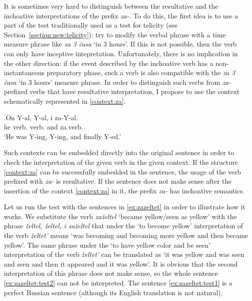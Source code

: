 It is sometimes very hard to distinguish between the resultative and the inchoative interpretations of the prefix \textit{za-}. To do this, the first idea is to use a part of the test traditionally used as a test for telicity (see Section~\ref{section:new:telicity}): try to modify the verbal phrase with a time measure phrase like \textit{za 3 \v{c}asa} `in 3 hours'. If this is not possible, then the verb can only have inceptive intepretation. Unfortunately, there is no implication in the other direction: if the event described by the inchoative verb has a non-instantaneous preparatory phase, such a verb is also compatible with the \textit{za 3 \v{c}asa} `in 3 hours' measure phrase. In order to distinguish such verbs from \textit{za}-prefixed verbs that have resultative interpretation, I propose to use the context schematically represented in \ref{context:za}.

\exg.\label{context:za}On Y-al, Y-al, i za-Y-al.\\
he verb. verb. and za.verb.\\
\vspace{0.5em}
`He was Y-ing, Y-ing, and finally Y-ed.'

Such contexts can be embedded directly into the original sentence in order to check the interpretation of the given verb in the given context. If the structure \ref{context:za} can be successfully embedded in the sentence, the usage of the verb prefixed with \textit{za-} is resultative. If the sentence does not make sense after the insertion of the context \ref{context:za} in it, the prefix \textit{za-} has inchoative semantics.

Let us run the test with the sentences in \ref{ex:zazeltet} in order to illustrate how it works. We substitute the verb \textit{za\v{z}eltel} `became yellow/seen as yellow' with the phrase \textit{\v{z}eltel, \v{z}eltel, i za\v{z}eltel} that under the `to become yellow' interpretation of the verb \textit{\v{z}eltet'} means `was becoming and becoming more yellow and then became yellow'. The same phrase under the `to have yellow color and be seen' interpretation of the verb \textit{\v{z}eltet'} can be translated as `it was yellow and was seen and seen and then it appeared and it was yellow'. It is obvious that the second interpretation of this phrase does not make sense, so the whole sentence \ref{ex:zazeltet:test2} can not be interpreted. The sentence \ref{ex:zazeltet:test1} is a perfect Russian sentence (although its English translation is not natural).

